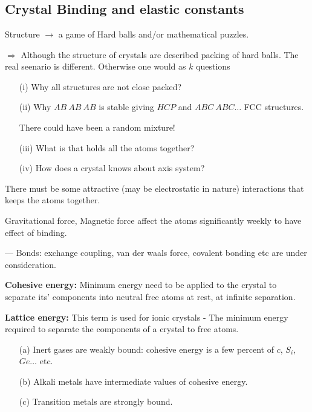 \chapter[Lecture 15]{}\label{lec15}

\section*{Crystal Binding and elastic constants}

Structure $\to$ a game of Hard balls and/or mathematical puzzles.

$\Rightarrow$ Although the structure of crystals are described packing of hard balls. The real seenario is different. Otherwise one would as $k$ questions
\begin{itemize}
\itemsep=0pt
\item[(i)] Why all structures are not close packed?

\item[(ii)] Why $AB \ AB\ AB$ is stable giving $HCP$ and $ABC \ ABC\ldots$ FCC structures.

There could have been a random mixture!

\item[(iii)] What is that holds all the atoms together?

\item[(iv)] How does a crystal knows about axis system? 
\end{itemize}

There must be some attractive (may be electrostatic in nature) interactions that keeps the atoms together.

Gravitational force, Magnetic force affect the atoms significantly weekly to have effect of binding.

--- Bonds: exchange coupling, van der waals force, covalent bonding etc are under consideration.

\noindent
{\bf Cohesive energy:} Minimum energy need to be applied to the crystal to separate its' components into neutral free atoms at rest, at infinite separation.

\noindent
{\bf Lattice energy:} This term is used for ionic crystals - The minimum energy required to separate the components of a crystal to free atoms.
\begin{itemize}
\itemsep=0pt
\item[(a)] Inert gases are weakly bound: cohesive energy is a few percent of $c$, $S_{i}$, $Ge\ldots$ etc.

\item[(b)] Alkali metals have intermediate values of cohesive energy.

\item[(c)] Transition metals are strongly bound.
\end{itemize}

